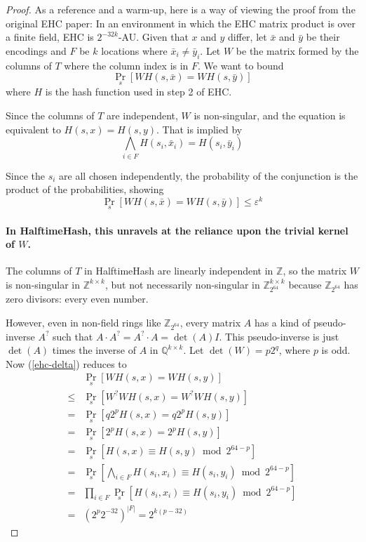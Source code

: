 \documentclass[sigconf, nonacm]{acmart}
\newcommand{\rats}{\mathbb{Q}}
\newcommand{\ints}{\mathbb{Z}}
\begin{document}
\begin{proof}
As a reference and a warm-up, here is a way of viewing the proof from the original EHC paper:
In an environment in which the EHC matrix product is over a finite field, EHC is $2^{-32k}$-AU.
Given that $x$ and $y$ differ, let $\bar{x}$ and $\bar{y}$ be their encodings and $F$ be $k$ locations where $\bar{x}_i \neq \bar{y}_i$.
Let $W$ be the matrix formed by the columns of $T$ where the column index is in $F$.
We want to bound
\begin{equation}
  \label{ehc-delta}
  \Pr_s[W  H(s,\bar{x}) = W H(s,\bar{y})]
\end{equation}
where $H$ is the hash function used in step 2 of EHC.

Since the columns of $T$ are independent, $W$ is non-singular, and the equation is equivalent to $H(s,x) = H(s,y)$.
That is implied by
\[
\bigwedge_{i \in F} H(s_i, \bar{x}_i) = H(s_i, \bar{y}_i)
\]

Since the $s_i$ are all chosen independently, the probability of the conjunction is the product of the probabilities, showing
\[
\Pr_s[W H(s,\bar{x}) = W H(s,\bar{y})] \leq \varepsilon^k
\]

\paragraph{In HalftimeHash, this unravels at the reliance upon the trivial kernel of $W$.}

The columns of $T$ in HalftimeHash are linearly independent in $\ints$, so the matrix $W$ is non-singular in $\ints^{k\times{}k}$, but not necessarily non-singular in $\ints_{2^{64}}^{k\times{}k}$ because $\ints_{2^{64}}$ has zero divisors: every even number.

However, even in non-field rings like $\ints_{2^{64}}$, every matrix $A$ has a kind of pseudo-inverse $A^?$ such that $A \cdot A^? = A^? \cdot A = \det(A) I$.
This pseudo-inverse is just $\det(A)$ times the inverse of $A$ in $\rats^{k\times{}k}$.
Let $\det(W) = p2^q$, where $p$ is odd.
Now (\ref{ehc-delta}) reduces to
\[
\begin{array}{rl}
  &  \Pr_s[W H(s,x) = W H(s,y)]\\
  \leq & \Pr_s[W^?WH(s,x) = W^?WH(s,y)] \\
  = & \Pr_s[q2^pH(s,x) = q2^pH(s,y)] \\
  = & \Pr_s[2^pH(s,x) = 2^pH(s,y)] \\
  = & \Pr_s[H(s,x) \equiv H(s,y) \bmod 2^{64-p}] \\
  = & \Pr_s\left[\bigwedge_{i \in F} H(s_i,x_i) \equiv H(s_i,y_i) \bmod 2^{64-p}\right] \\
  = & \prod_{i \in F} \Pr_s\left[ H(s_i,x_i) \equiv H(s_i,y_i) \bmod 2^{64-p}\right] \\
  = & \left(2^p 2^{-32}\right)^{|F|} = 2^{k(p-32)}
\end{array}
\]
\end{proof}
\end{document}
